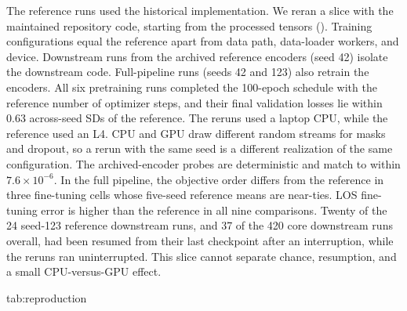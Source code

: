 The reference runs used the historical implementation. We reran a \MIMIC{} slice with the maintained repository code, starting from the processed tensors (). Training configurations equal the reference apart from data path, data-loader workers, and device. Downstream runs from the archived reference encoders (seed 42) isolate the downstream code. Full-pipeline runs (seeds 42 and 123) also retrain the encoders. All six pretraining runs completed the 100-epoch schedule with the reference number of optimizer steps, and their final validation losses lie within 0.63 across-seed SDs of the reference. The reruns used a laptop CPU, while the reference used an L4. CPU and GPU draw different random streams for masks and dropout, so a rerun with the same seed is a different realization of the same configuration. The archived-encoder probes are deterministic and match to within $7.6\times10^{-6}$. In the full pipeline, the objective order differs from the reference in three fine-tuning cells whose five-seed reference means are near-ties. LOS fine-tuning error is higher than the reference in all nine comparisons. Twenty of the 24 seed-123 reference downstream runs, and 37 of the 420 core downstream runs overall, had been resumed from their last checkpoint after an interruption, while the reruns ran uninterrupted. This slice cannot separate chance, resumption, and a small CPU-versus-GPU effect.

\begin{table}[htbp]
\floatconts
  {tab:reproduction}
  {\caption{Maintained-framework reruns against the same-seed reference runs on \MIMIC{}. $|\Delta|$ is the absolute difference in the test metric. SD columns count runs whose primary-metric difference lies within one or two reference across-seed SDs of the same objective, task, and protocol.}}
  {\scriptsize
  }
\end{table}
